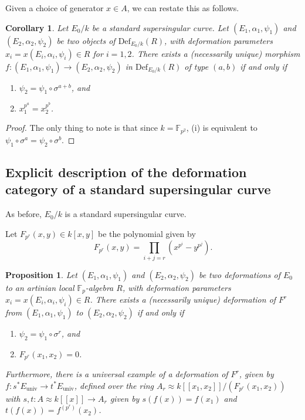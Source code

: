 \documentclass[11pt]{amsart}
\numberwithin{equation}{section}
\theoremstyle{plain}
\newtheorem{prop}[subsection]{Proposition}
\newtheorem{cor}[subsection]{Corollary}
\theoremstyle{remark}
\theoremstyle{plain}
\begin{document}
Given a choice of generator $x\in A$, we can restate this as follows.
\begin{cor}
Let $E_0/k$ be a standard supersingular curve.
Let $(E_1,\alpha_1,\psi_1)$ and $(E_2,\alpha_2,\psi_2)$ be two objects
of ${\mathrm{Def}}_{E_0/k}(R)$, with deformation parameters
$x_i=x(E_i,\alpha_i,\psi_i)\in R$ for $i=1,2$. 
There exists a (necessarily unique) morphism $f\colon
(E_1,\alpha_1,\psi_1){\rightarrow} (E_2,\alpha_2,\psi_2)$ in ${\mathrm{Def}}_{E_0/k}(R)$
of type $(a,b)$ if and only if
\begin{enumerate}
\item [(i)] $\psi_2=\psi_1\circ \sigma^{a+b}$, and 
\item [(ii)] $x_1^{p^a}=x_2^{p^b}$.
\end{enumerate}
\end{cor}
\begin{proof}
The only thing to note is that since $k={\mathbb{F}}_{p^2}$,
(i) is equivalent to $\psi_1\circ \sigma^a=\psi_2\circ \sigma^b$.
\end{proof}

\subsection{Explicit description of the deformation category of a 
  standard supersingular curve}
\label{subsec:explicit-description-ss}

As before, $E_0/k$ is a standard supersingular curve.

Let $F_{p^r}(x,y)\in k[x,y]$ be the polynomial given by
\[
F_{p^r}(x,y)= \prod_{i+j=r}(x^{p^i}-y^{p^j}).
\]
\begin{prop}\label{prop:explicit-description-of-def-category}
Let $(E_1,\alpha_1,\psi_1)$ and $(E_2,\alpha_2,\psi_2)$ be two
deformations of $E_0$ to an artinian local ${\mathbb{F}}_p$-algebra $R$, with
deformation parameters 
$x_i=x(E_i,\alpha_i,\psi_i)\in R$.  There exists a (necessarily
unique) deformation of $F^r$
from
$(E_1,\alpha_1,\psi_1)$ to $(E_2,\alpha_2,\psi_2)$ if and only if
\begin{enumerate}
\item [(i)] $\psi_2=\psi_1\circ \sigma^r$, and
\item [(ii)] $F_{p^r}(x_1,x_2)=0$.
\end{enumerate}

Furthermore, there is a universal example of a deformation of $F^r$,
given by $f\colon s^*E_{\mathrm{univ}}{\rightarrow} t^*E_{\mathrm{univ}}$, defined over the ring
$A_r\approx k{[\![{x_1,x_2}]\!]}/(F_{p^r}(x_1,x_2))$ with $s,t\colon
A\approx k{[\![{x}]\!]}{\rightarrow} 
A_r$ given by $s(f(x))=f(x_1)$ and $t(f(x))=f^{(p^r)}(x_2)$.  
\end{prop}
\end{document}
